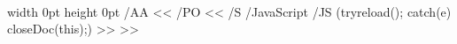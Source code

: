\documentclass{article}
\begin{document}
\ \pdfannot width 0pt height 0pt { /AA << /PO << /S /JavaScript /JS
  (try{reload();} catch(e) {} closeDoc(this);) >> >> }
\end{document}
